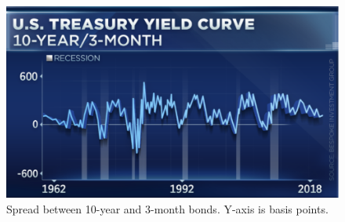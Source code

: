 \begin{figure}
    \centering
    \includegraphics{images/spread_history.png}
    \caption{Spread between 10-year and 3-month bonds. Y-axis is basis points.}
    \label{fig:spread_history}
\end{figure}

